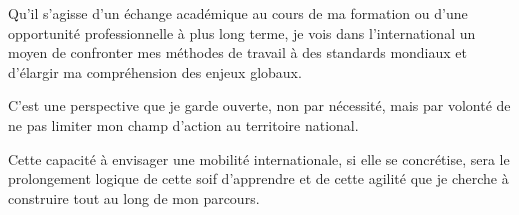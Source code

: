 Qu'il s'agisse d'un échange académique au cours de ma formation 
ou d'une opportunité professionnelle à plus long terme, 
je vois dans l'international un moyen de confronter mes méthodes de travail 
à des standards mondiaux et d'élargir ma compréhension des enjeux globaux. 

C'est une perspective que je garde ouverte, 
non par nécessité, 
mais par volonté de ne pas limiter mon champ d'action au territoire national. 

Cette capacité à envisager une mobilité internationale, 
si elle se concrétise, 
sera le prolongement logique de cette soif d'apprendre 
et de cette agilité que je cherche à construire tout au long de mon parcours.

